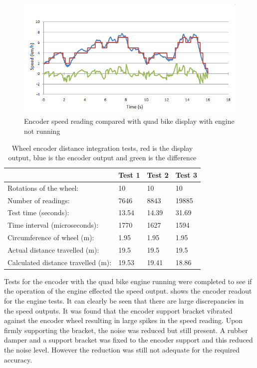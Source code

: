 \documentclass[main.tex]{subfiles}
\begin{document}
\begin{figure}[ht]
\includegraphics[width=1\textwidth]{5-Testing/encoder_data_20x_sampled.png}
\centering
\caption[Encoder speed reading compared with quad bike display]{Encoder speed reading compared with quad bike display with engine not running}
\end{figure}

\begin{table}[ht]
\centering
\caption[Wheel encoder distance integration tests]{Wheel encoder distance integration tests, red is the display output, blue is the encoder output and green is the difference}
\begin{tabular}{llll}
\toprule
                                   & Test 1 & Test 2 & Test 3 \\ \midrule
Rotations of the wheel:            & 10     & 10     & 10     \\
Number of readings:                & 7646   & 8843   & 19885  \\
Test time (seconds):               & 13.54  & 14.39  & 31.69  \\
Time interval (microseconds):      & 1770   & 1627   & 1594   \\
Circumference of wheel (m):        & 1.95   & 1.95   & 1.95   \\
Actual distance travelled (m):     & 19.5   & 19.5   & 19.5   \\
Calculated distance travelled (m): & 19.53  & 19.41  & 18.86  \\ \bottomrule
\end{tabular}
\end{table}

Tests for the encoder with the quad bike engine running were completed to see if the operation of the engine effected the speed output.  shows the encoder readout for the engine tests. It can clearly be seen that there are large discrepancies in the speed outputs. It was found that the encoder support bracket vibrated against the encoder wheel resulting in large spikes in the speed reading. Upon firmly supporting the bracket, the noise was reduced but still present. A rubber damper and a support bracket was fixed to the encoder support and this reduced the noise level. However the reduction was still not adequate for the required accuracy. 
\end{document}
